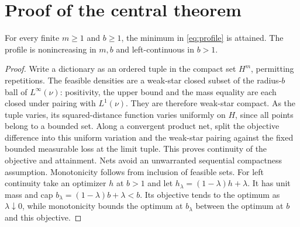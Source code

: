 \section{Proof of the central theorem}
\begin{lemma}\label{lem:attainment}
For every finite $m\ge1$ and $b\ge1$, the minimum in \eqref{eq:profile} is attained. The profile is nonincreasing in $m,b$ and left-continuous in $b>1$.
\end{lemma}
\begin{proof}
Write a dictionary as an ordered tuple in the compact set $H^m$, permitting repetitions. The feasible densities are a weak-star closed subset of the radius-$b$ ball of $L^\infty(\nu)$: positivity, the upper bound and the mass equality are each closed under pairing with $L^1(\nu)$. They are therefore weak-star compact. As the tuple varies, its squared-distance function varies uniformly on $H$, since all points belong to a bounded set. Along a convergent product net, split the objective difference into this uniform variation and the weak-star pairing against the fixed bounded measurable loss at the limit tuple. This proves continuity of the objective and attainment. Nets avoid an unwarranted sequential compactness assumption. Monotonicity follows from inclusion of feasible sets. For left continuity take an optimizer $h$ at $b>1$ and let $h_\lambda=(1-\lambda)h+\lambda$. It has unit mass and cap $b_\lambda=(1-\lambda)b+\lambda<b$. Its objective tends to the optimum as $\lambda\downarrow0$, while monotonicity bounds the optimum at $b_\lambda$ between the optimum at $b$ and this objective.
\end{proof}

